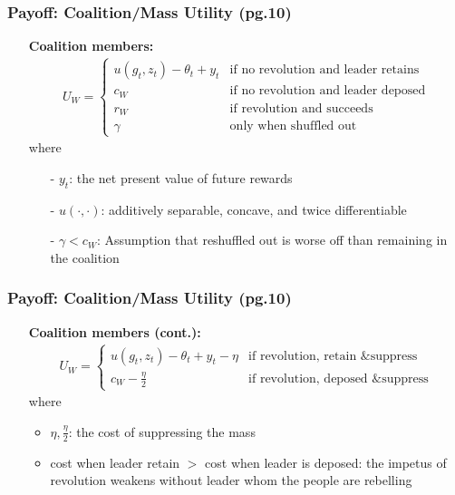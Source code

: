 \documentclass[10pt,handout]{beamer}
\begin{document}

\begin{frame}
\frametitle{Payoff: Coalition/Mass Utility (pg.10)}
\begin{itemize}
    \item[] \textbf{Coalition members:}
    \begin{align*}
        U_W = 
        \begin{cases}
            u(g_t, z_t) - \theta_t + y_t &\text{if no revolution and leader retains} \\
            c_W &\text{if no revolution and leader deposed} \\
            r_W &\text{if revolution and succeeds} \\
            \gamma &\text{only when shuffled out}
        \end{cases}
    \end{align*}
    where
    \begin{itemize}
        \item[-] $y_t$: the net present value of future rewards
        \item[-] $u(\cdot, \cdot)$: additively separable, concave, and twice differentiable
        \item[-] $\gamma < c_W$: Assumption that reshuffled out is worse off than remaining in the coalition 
    \end{itemize}
\end{itemize}
\end{frame}

\begin{frame}
\frametitle{Payoff: Coalition/Mass Utility (pg.10)}
\begin{itemize}
    \item[] \textbf{Coalition members (cont.):}
    \begin{align*}
        U_W = 
        \begin{cases}
            u(g_t, z_t) - \theta_t + y_t - \eta &\text{if revolution, retain \& suppress} \\
            c_W - \frac{\eta}{2} &\text{if revolution, deposed \& suppress}
        \end{cases}
    \end{align*}
    where
    \begin{itemize}
        \item $\eta, \frac{\eta}{2}$: the cost of suppressing the mass
        \item cost when leader retain $>$ cost when leader is deposed: the impetus of revolution weakens without leader whom the people are rebelling
    \end{itemize}
\end{itemize}
\end{frame}
\end{document}
